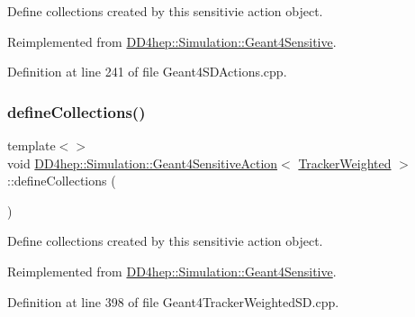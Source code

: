 Define collections created by this sensitivie action object. 



Reimplemented from \hyperlink{class_d_d4hep_1_1_simulation_1_1_geant4_sensitive_a88c872b79e49e399c8ee282960c2d77d}{D\+D4hep\+::\+Simulation\+::\+Geant4\+Sensitive}.



Definition at line 241 of file Geant4\+S\+D\+Actions.\+cpp.

\hypertarget{class_d_d4hep_1_1_simulation_1_1_geant4_sensitive_action_af2a7d081e4173833bd77977cbc20ee0f}{}\label{class_d_d4hep_1_1_simulation_1_1_geant4_sensitive_action_af2a7d081e4173833bd77977cbc20ee0f} 
\subsubsection{\texorpdfstring{define\+Collections()}{defineCollections()}\hspace{0.1cm}{\footnotesize\ttfamily [5/7]}}
{\footnotesize\ttfamily template$<$$>$ \\
void \hyperlink{class_d_d4hep_1_1_simulation_1_1_geant4_sensitive_action}{D\+D4hep\+::\+Simulation\+::\+Geant4\+Sensitive\+Action}$<$ \hyperlink{struct_d_d4hep_1_1_simulation_1_1_tracker_weighted}{Tracker\+Weighted} $>$\+::define\+Collections (\begin{DoxyParamCaption}{ }\end{DoxyParamCaption})\hspace{0.3cm}{\ttfamily [virtual]}}



Define collections created by this sensitivie action object. 



Reimplemented from \hyperlink{class_d_d4hep_1_1_simulation_1_1_geant4_sensitive_a88c872b79e49e399c8ee282960c2d77d}{D\+D4hep\+::\+Simulation\+::\+Geant4\+Sensitive}.



Definition at line 398 of file Geant4\+Tracker\+Weighted\+S\+D.\+cpp.

\hypertarget{class_d_d4hep_1_1_simulation_1_1_geant4_sensitive_action_a6faf8e3de0d88a7a7f2db664300718ad}{}\label{class_d_d4hep_1_1_simulation_1_1_geant4_sensitive_action_a6faf8e3de0d88a7a7f2db664300718ad} 
